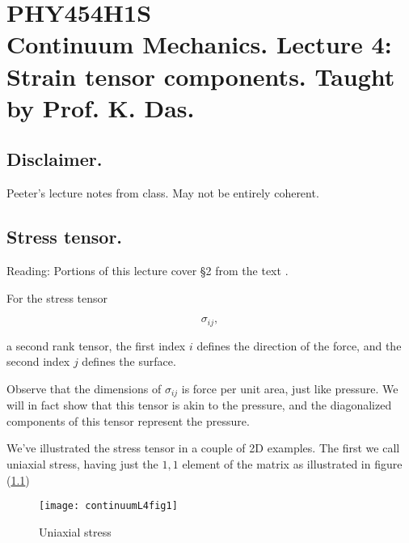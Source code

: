 
%

\chapter{PHY454H1S\\Continuum Mechanics.  Lecture 4: Strain tensor components.  Taught by Prof. K. Das.}
\label{chap:continuumL4}
{}
\date{Jan 20, 2012}

\beginArtWithToc

\section{Disclaimer.}

Peeter's lecture notes from class.  May not be entirely coherent.

\section{Stress tensor.}

Reading: Portions of this lecture cover \S 2 from the text \cite{landau1960theory}.

For the stress tensor

\begin{equation}\label{eqn:continuumL4:10}
\sigma_{ij},
\end{equation}

a second rank tensor, the first index $i$ defines the direction of the force, and the second index $j$ defines the surface.

Observe that the dimensions of $\sigma_{ij}$ is force per unit area, just like pressure.  We will in fact show that this tensor is akin to the pressure, and the diagonalized components of this tensor represent the pressure.

We've illustrated the stress tensor in a couple of 2D examples.  The first we call uniaxial stress, having just the $1,1$ element of the matrix as illustrated in figure (\ref{fig:continuumL4:continuumL4fig1})

\begin{figure}[htp]
   \centering
   \texttt{[image: continuumL4fig1]}
   \caption{Uniaxial stress}\label{fig:continuumL4:continuumL4fig1}
\end{figure}

